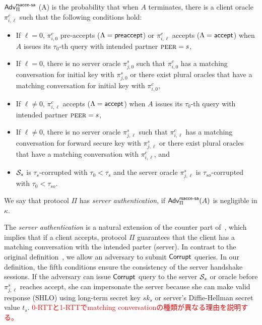 \begin{definition} \label{def:rsacce-sa}
 $\mathsf{Adv}^{\mathsf{rsacce\textsc{-} sa}}_{\Pi}$ (A) is the probability that when
 $A$ terminates, there is a client oracle $\pi^c_{i, \ell}$
 such that the following conditions hold:
 \begin{itemize}
  \item{If $\ell = 0$, $\pi^c_{i, 0}$ pre-accepts
  ($\Lambda = \mathsf{preaccept}$) or $\pi^c_{i, \ell}$
  accepts ($\Lambda = \mathsf{accept}$) when $A$ issues its
  $\tau_0$-th query with intended partner $\textsc{peer}=s$, }

  \item{If $\ell = 0$, there is no server oracle
  $\pi^s_{j, 0}$ such
  that $\pi^c_{i,0}$ has a matching conversation for initial
  key with
  $\pi^s_{j,0}$ or there exist plural oracles that have
  a matching conversation for initial key with $\pi^c_{i,0}$,}

  \item{If $\ell \neq 0$, $\pi^c_{i, \ell}$
  accepts ($\Lambda = \mathsf{accept}$) when $A$ issues its
  $\tau_0$-th query with intended partner $\textsc{peer}=s$, }

  \item{If $\ell \neq 0$, there is no server oracle
  $\pi^s_{j, \ell}$ such
  that $\pi^c_{i,\ell}$ has a matching conversation for forward
  secure key with
  $\pi^s_{j,\ell}$ or there exist plural oracles that have
  a matching conversation with $\pi^c_{i,\ell}$, and}

  \item{$\mathcal{S}_s$ is $\tau_{s}$-corrupted with
  $\tau_0 < \tau_{s}$ and the server oracle $\pi^s_{j, \ell}$ is
  $\tau_{so}$-corrupted with $\tau_0 < \tau_{so}$. }

 \end{itemize}
 We say that protocol $\Pi$ has \textit{server authentication},
 if $\mathsf{Adv}^{\mathsf{rsacce\textsc{-} sa}}_{\Pi}(A)$ is negligible in $\kappa$.
\end{definition}

\begin{remark}
 The \textit{server authentication} is a natural extension
 of the counter part of~\cite{KPW13:SACCE}, which implies
 that if a client accepts, protocol $\Pi$ guarantees that
 the client has a matching conversation with the intended
 parter (server). In contrast to the original
 definition~\cite{KPW13:SACCE}, we allow an adversary to
 submit $\mathsf{Corrupt}$ queries.
 In our definition, the fifth conditions ensure the
 consistency of the server handshake sessions.
 If the adversary can issue $\mathsf{Corrupt}$ query to the server
 $\mathcal{S}_s$ or oracle before $\pi^s_{j, \ell}$ reaches accept, she can
 impersonate the server because she can make valid response
 (SHLO) using long-term secret key $sk_s$ or server's
 Diffie-Hellman secret value $t_s$.
 \textcolor{red}{
 0-RTTと1-RTTでmatching conversationの種類が異なる理由を説明する。
 }
 \end{remark}

